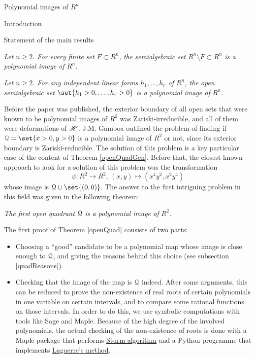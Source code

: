 \documentclass[11pt, a4paper, english, twoside, notitlepage, openright]{report}
\begin{document}
\begin{chapter}{Polynomial images of $R^n$}
\begin{section}{Introduction}
\begin{subsection}{Statement of the main results}
\begin{theorem}\label{finSetTh}\em Let $n\ge2$. For every finite set $F\subset R^n$, the semialgebraic set $R^n\setminus F\subset R^n$ is a polynomial image of $R^n$.\em
\end{theorem}
\begin{theorem}\label{openQuadGen}\em Let $n\ge 2$. For any independent linear forms $h_1,\dots,h_r$ of $R^n$, the open semialgebraic set $\set{h_1>0,\dots,h_r>0}$ is a polynomial image of $R^n$.\em
\end{theorem}
	
Before the paper \cite{fg} was published, the exterior boundary of all open sets that were known to be polynomial images of $R^2$ was Zariski-irreducible, and all of them were deformations of $\mathscr{H}$. J.M. Gamboa outlined the problem of finding if $\Qu=\set{x>0,y>0}$ is a polynomial image of $R^2$ or not, since its exterior boundary is Zariski-reducible. The solution of this problem is a key particular case of the content of Theorem \ref{openQuadGen}. Before that, the closest known approach to look for a solution of this problem was the transformation
$$
\psi:R^2 \to R^2,\, (x,y)\mapsto(x^4y^2,x^2y^4)
$$	
whose image is $\Qu\cup\set{(0,0)}$. The answer to the first intriguing problem in this field was given in the following theorem:
\begin{theorem}\label{openQuad}\em The first open quadrant $\mathcal{Q}$ is a polynomial image of $R^2$.\em
\end{theorem}
	
\begin{remark} The first proof of Theorem \ref{openQuad} consists of two parts:
\begin{itemize}
\item Choosing a ``good'' candidate to be a polynomial map whose image is close enough to $\mathcal{Q}$, and giving the reasons behind this choice (see subsection \ref{quadReasons}). 
	
\item Checking that the image of the map is $\mathcal{Q}$ indeed. After some arguments, this can be reduced to prove the non-existence of real roots of certain polynomials in one variable on certain intervals, and to compare some rational functions on those intervals. In order to do this, we use symbolic computations with tools like Sage and Maple. Because of the high degree of the involved polynomials, the actual checking of the non-existence of roots is done with a Maple package that performs \hyperref[sturm]{Sturm algorithm} and a Python programme that implements \hyperref[laguerre]{Laguerre's method}.
\end{itemize}
\end{remark}


\end{subsection}
\end{section}
\end{chapter}
\end{document}
